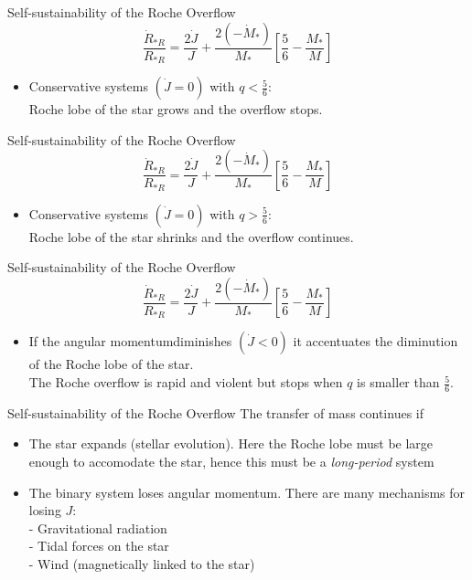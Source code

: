 \documentclass{beamer}
\begin{document}
\begin{frame}{Self-sustainability of the Roche Overflow}
	\[ \frac{\dot{R}_{*R}}{R_{*R}} = \frac{2\dot{J}}{J} + \frac{2 (- \dot{M}_*)}{M_*} \left[ \frac{5}{6} - \frac{M_*}{M}\right]\]
	\begin{itemize}
	\pause
	\item Conservative systems $\left( \dot{J} = 0 \right)$ with $ q<\frac{5}{6} $: \\
	Roche lobe of the star grows and the overflow stops.
	\end{itemize}
\end{frame}

\begin{frame}{Self-sustainability of the Roche Overflow}
	\[ \frac{\dot{R}_{*R}}{R_{*R}} = \frac{2\dot{J}}{J} + \frac{2 (- \dot{M}_*)}{M_*} \left[ \frac{5}{6} - \frac{M_*}{M}\right]\]
	\begin{itemize}
	\pause
	\item Conservative systems $\left( \dot{J} = 0 \right)$ with $ q>\frac{5}{6} $: \\
	Roche lobe of the star shrinks and the overflow continues.
	\end{itemize}
\end{frame}

\begin{frame}{Self-sustainability of the Roche Overflow}
	\[ \frac{\dot{R}_{*R}}{R_{*R}} = \frac{2\dot{J}}{J} + \frac{2 (- \dot{M}_*)}{M_*} \left[ \frac{5}{6} - \frac{M_*}{M}\right]\]
	\begin{itemize}
	\pause
	\item If the angular momentumdiminishes $\left( \dot{J} < 0 \right)$ it accentuates the diminution of the Roche lobe of the star.\\
	\pause
	The Roche overflow is rapid and violent but stops when $q$ is smaller than $\frac{5}{6}$.
	\end{itemize}
\end{frame}

\begin{frame}{Self-sustainability of the Roche Overflow}
	The transfer of mass continues if	
	\begin{itemize}
	\item The star expands (stellar evolution). Here the Roche lobe must be large enough to accomodate the star, hence this must be a \textit{long-period} system
	\pause
	\item The binary system loses angular momentum. There are many mechanisms for losing $J$:\\
	\pause
	- Gravitational radiation\\
	\pause
	- Tidal forces on the star\\
	\pause
	- Wind (magnetically linked to the star)
	\end{itemize}
\end{frame}
\end{document}

